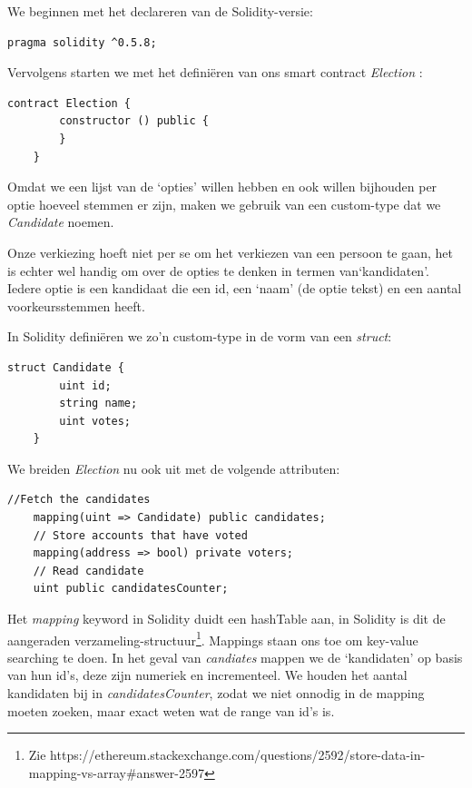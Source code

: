 	We beginnen met het declareren van de Solidity-versie:

	\lstset{language=JavaScriptSolidity} 
	\begin{lstlisting}[numbers=none]
	pragma solidity ^0.5.8;
	\end{lstlisting}
	\lstset{language=JavaScriptSolidity} 

	Vervolgens starten we met het definiëren van ons smart contract \textit{Election} :
	\begin{lstlisting}[numbers=none]	
	contract Election {
		constructor () public {
		}
	}
	\end{lstlisting}
	
	Omdat we een lijst van de `opties' willen hebben en ook willen bijhouden per optie hoeveel stemmen er zijn, maken we gebruik van een custom-type dat we \textit{Candidate} noemen. 

	Onze verkiezing hoeft niet per se om het verkiezen van een persoon te gaan, het is echter wel handig om over de opties te denken in termen van`kandidaten'. 
	Iedere optie is een kandidaat die een id, een `naam' (de optie tekst) en een aantal voorkeursstemmen heeft. 
	
	In Solidity definiëren we zo'n custom-type in de vorm van een \textit{struct}:
	
	\begin{lstlisting}[numbers=none]	
	struct Candidate {
		uint id;
		string name;
		uint votes;
	}
	\end{lstlisting}
	
	We breiden \textit{Election} nu ook uit met de volgende attributen:
	
	\begin{lstlisting}[numbers=none]
	//Fetch the candidates	
	mapping(uint => Candidate) public candidates;
	// Store accounts that have voted
	mapping(address => bool) private voters;
	// Read candidate
	uint public candidatesCounter;
	\end{lstlisting}
	
	Het \textit{mapping} keyword in Solidity duidt een hashTable aan, in Solidity is dit de aangeraden verzameling-structuur\footnote{Zie https://ethereum.stackexchange.com/questions/2592/store-data-in-mapping-vs-array\#answer-2597}.  Mappings staan ons toe om key-value searching te doen. In het geval van  \textit{candiates} mappen we de `kandidaten' op basis van hun id's, deze zijn numeriek en incrementeel. We houden het aantal kandidaten bij in \textit{candidatesCounter}, zodat we niet onnodig in de mapping moeten zoeken, maar exact weten wat de range van id's is.
	
